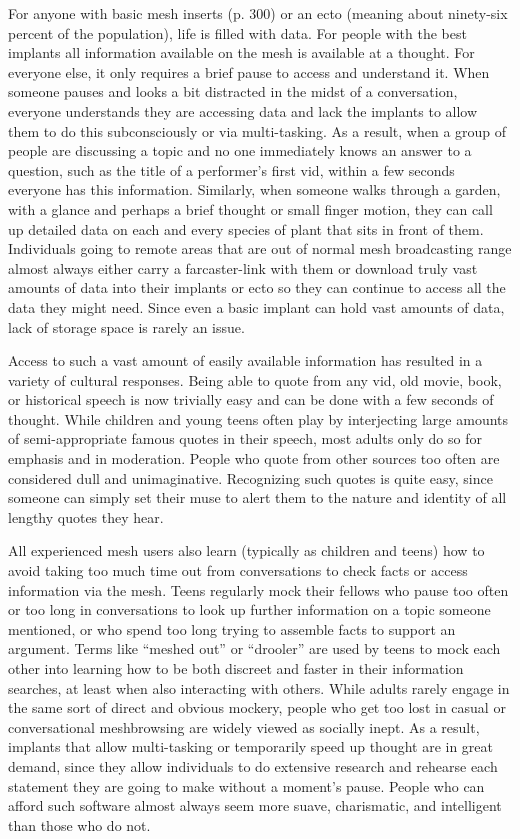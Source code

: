 For anyone with basic mesh inserts (p. 300) or an ecto 
(meaning about ninety-six percent of the population), 
life is filled with data. For people with the best implants
all information available on the mesh is available
at a thought. For everyone else, it only requires a
brief pause to access and understand it. When someone
pauses and looks a bit distracted in the midst of a
conversation, everyone understands they are accessing 
data and lack the implants to allow them to do this 
subconsciously or via multi-tasking. As a result, when 
a group of people are discussing a topic and no one 
immediately knows an answer to a question, such as 
the title of a performer's first vid, within a few seconds 
everyone has this information. Similarly, when someone
walks through a garden, with a glance and
perhaps a brief thought or small finger motion, they 
can call up detailed data on each and every species of 
plant that sits in front of them. Individuals going to 
remote areas that are out of normal mesh broadcasting
range almost always either carry a farcaster-link
with them or download truly vast amounts of data 
into their implants or ecto so they can continue to 
access all the data they might need. Since even a basic 
implant can hold vast amounts of data, lack of storage 
space is rarely an issue.

Access to such a vast amount of easily available 
information has resulted in a variety of cultural 
responses. Being able to quote from any vid, old movie, 
book, or historical speech is now trivially easy and 
can be done with a few seconds of thought. While 
children and young teens often play by interjecting 
large amounts of semi-appropriate famous quotes in 
their speech, most adults only do so for emphasis and 
in moderation. People who quote from other sources 
too often are considered dull and unimaginative. Recognizing
such quotes is quite easy, since someone can
simply set their muse to alert them to the nature and 
identity of all lengthy quotes they hear.

All experienced mesh users also learn (typically as 
children and teens) how to avoid taking too much 
time out from conversations to check facts or access 
information via the mesh. Teens regularly mock their 
fellows who pause too often or too long in conversations
to look up further information on a topic
someone mentioned, or who spend too long trying 
to assemble facts to support an argument. Terms like 
``meshed out'' or ``drooler'' are used by teens to mock 
each other into learning how to be both discreet and 
faster in their information searches, at least when also 
interacting with others. While adults rarely engage 
in the same sort of direct and obvious mockery, 
people who get too lost in casual or conversational 
meshbrowsing are widely viewed as socially inept. As 
a result, implants that allow multi-tasking or temporarily
speed up thought are in great demand, since
they allow individuals to do extensive research and 
rehearse each statement they are going to make without
a moment's pause. People who can afford such
software almost always seem more suave, charismatic, 
and intelligent than those who do not.

